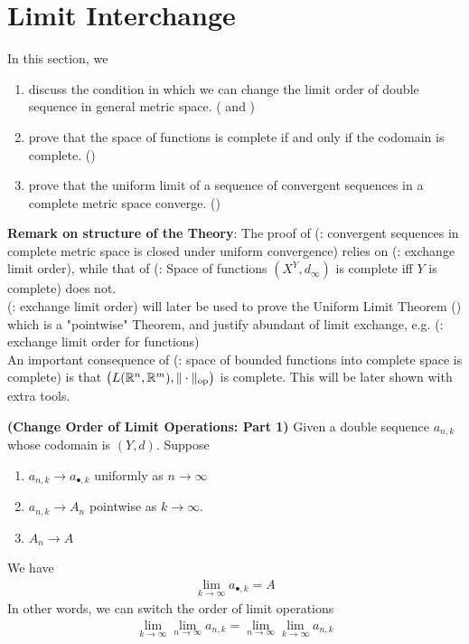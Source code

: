 \documentclass{report}
\begin{document}
\section{Limit Interchange}
\begin{mdframed}
In this section, we 
\begin{enumerate}[label=(\alph*)]
  \item discuss the condition in which we can change the limit order of double sequence in general metric space. ( and )
  \item prove that the space of functions is complete if and only if the codomain is complete. ()
  \item prove that the uniform limit of a sequence of convergent sequences in a complete metric space converge. ()
\end{enumerate}
\textbf{Remark on structure of the Theory}: The proof of  (: convergent sequences in complete metric space is closed under uniform convergence) relies on (: exchange limit order), while that of (: Space of functions $(X^Y, d_\infty)$ is complete iff $Y$ is complete) does not.\\

(: exchange limit order) will later be used to prove the Uniform Limit Theorem () which is a "pointwise" Theorem, and justify abundant of limit exchange, e.g. (: exchange limit order for functions)\\

An important consequence of (: space of bounded functions into complete space is complete) is that $\big(L(\mathbb{R}^n,\mathbb{R}^m), \| \cdot \|_{\text{op}} \big)$ is complete. This will be later shown with extra tools. 
\end{mdframed}
\begin{theorem}
\label{COLO}
\textbf{(Change Order of Limit Operations: Part 1)} Given a double sequence $a_{n,k}$ whose codomain is $(Y,d)$. Suppose
\begin{enumerate}[label=(\alph*)]
  \item $a_{n,k}\to a_{\bullet,k}$ uniformly as $n\to \infty$ 
  \item $a_{n,k}\to A_n$ pointwise as  $k\to \infty$.
  \item $A_n \to A$ 
\end{enumerate}
We have  
\begin{align*}
\lim_{k\to \infty}a_{\bullet,k}=A
\end{align*}
In other words, we can switch the order of limit operations
\begin{align*}
\lim_{k\to \infty}\lim_{n\to \infty}a_{n,k}=\lim_{n\to \infty}\lim_{k\to \infty}a_{n,k}
\end{align*}
\end{theorem}
\end{document}
